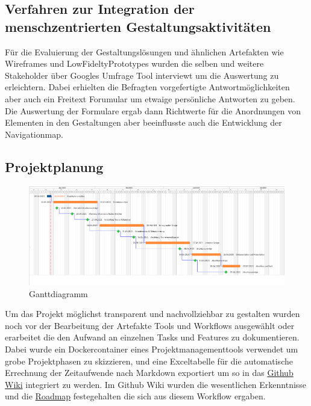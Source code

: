 \subsection{Verfahren zur Integration der menschzentrierten Gestaltungsaktivitäten}     
Für die Evaluierung der Gestaltungslösungen und ähnlichen Artefakten wie Wireframes und LowFideltyPrototypes wurden die selben und weitere Stakeholder über Googles Umfrage Tool interviewt um die Auswertung zu erleichtern. Dabei erhielten die Befragten vorgefertigte Antwortmöglichkeiten aber auch ein Freitext Forumular um etwaige persönliche Antworten zu geben. Die Auswertung der Formulare ergab dann Richtwerte für die Anordnungen von Elementen in den Gestaltungen aber beeinflusste auch die Entwicklung der Navigationmap.

\subsection{Projektplanung}
\begin{figure}[h] %
    \includegraphics[width=1\textwidth]{images/ganttdiagramm.png}
    \caption[Ganttdiagramm]{Ganttdiagramm}
    \label{fig:ganttdiagramm}
\end{figure}
Um das Projekt möglichst transparent und nachvollziehbar zu gestalten wurden noch vor der Bearbeitung der Artefakte Tools und Workflows ausgewählt oder erarbeitet die den Aufwand an einzelnen Tasks und Features zu dokumentieren. Dabei wurde ein Dockercontainer eines Projektmanagementtools verwendet um grobe Projektphasen zu skizzieren, und eine Exceltabelle für die automatische Errechnung der Zeitaufwende nach Markdown exportiert um so in das \href{https://github.com/Inf166/PPSS21Mai/wiki}{Github Wiki} integriert zu werden. Im Github Wiki wurden die wesentlichen Erkenntnisse und die \href{https://github.com/Inf166/PPSS21Mai/wiki/Roadmap}{Roadmap} festegehalten die sich aus diesem Workflow ergaben.\\